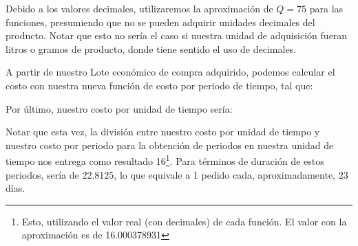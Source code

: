 
Debido a los valores decimales, utilizaremos la aproximación de $Q = 75$ para las funciones, presumiendo que no se pueden adquirir unidades decimales del producto. Notar que esto no sería el caso si nuestra unidad de adquisición fueran litros o gramos de producto, donde tiene sentido el uso de decimales.

A partir de nuestro Lote económico de compra adquirido, podemos calcular el costo con nuestra nueva función de costo por periodo de tiempo, tal que:


Por último, nuestro costo por unidad de tiempo sería:


Notar que esta vez, la división entre nuestro costo por unidad de tiempo y nuestro costo por periodo para la obtención de periodos en nuestra unidad de tiempo nos entrega como resultado 16\footnote{Esto, utilizando el valor real (con decimales) de cada función. El valor con la aproximación es de 16.000378931}. Para términos de duración de estos periodos, sería de 22.8125, lo que equivale a 1 pedido cada, aproximadamente, 23 días.

\clearpage

